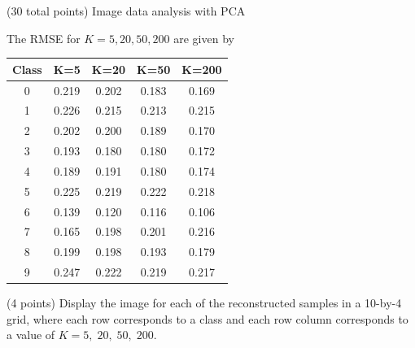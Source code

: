 \documentclass[12pt]{article}
\begin{document}
\begin{question}{(30 total points) Image data analysis with PCA}
\begin{subquestion}
      \begin{answerbox}{25em}
			The RMSE for $K=5,20,50,200$ are given by
         \begin{center}
				\begin{tabular}{ | c | c | c | c | c |} \hline
					Class & K=5 & K=20 & K=50 & K=200\\ \hline
					0 & 0.219 & 0.202 & 0.183 & 0.169\\ \hline
					1 & 0.226 & 0.215 & 0.213 & 0.215\\ \hline
					2 & 0.202 & 0.200 & 0.189 & 0.170\\ \hline
					3 & 0.193 & 0.180 & 0.180 & 0.172\\ \hline
					4 & 0.189 & 0.191 & 0.180 & 0.174\\ \hline
					5 & 0.225 & 0.219 & 0.222 & 0.218\\ \hline
					6 & 0.139 & 0.120 & 0.116 & 0.106\\ \hline
					7 & 0.165 & 0.198 & 0.201 & 0.216\\ \hline
					8 & 0.199 & 0.198 & 0.193 & 0.179\\ \hline
					9 & 0.247 & 0.222 & 0.219 & 0.217\\ \hline
				\end{tabular}
			\end{center}
      \end{answerbox}
  


   \end{subquestion}
   
   \begin{subquestion}{(4 points)
       Display the image for each of the reconstructed samples in
       a 10-by-4 grid, where each row corresponds to a class and
       each row column corresponds to a value of $K=5, \; 20, \; 50, \; 200$.
     } \label{Q1.7}


   


\end{subquestion}
\end{question}
\end{document}
